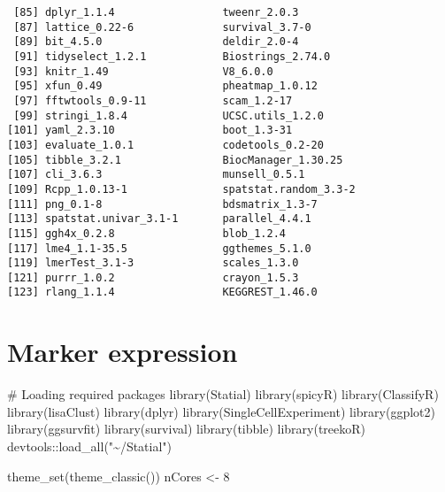 \documentclass[
  letterpaper,
  DIV=11,
  numbers=noendperiod]{scrreprt}
\newenvironment{Shaded}{\begin{snugshade}}{\end{snugshade}}
\newcommand{\CommentTok}[1]{\textcolor[rgb]{0.37,0.37,0.37}{#1}}
\newcommand{\DecValTok}[1]{\textcolor[rgb]{0.68,0.00,0.00}{#1}}
\newcommand{\FunctionTok}[1]{\textcolor[rgb]{0.28,0.35,0.67}{#1}}
\newcommand{\NormalTok}[1]{\textcolor[rgb]{0.00,0.23,0.31}{#1}}
\newcommand{\OtherTok}[1]{\textcolor[rgb]{0.00,0.23,0.31}{#1}}
\newcommand{\SpecialCharTok}[1]{\textcolor[rgb]{0.37,0.37,0.37}{#1}}
\newcommand{\StringTok}[1]{\textcolor[rgb]{0.13,0.47,0.30}{#1}}
\begin{document}
\begin{verbatim}
 [85] dplyr_1.1.4                 tweenr_2.0.3               
 [87] lattice_0.22-6              survival_3.7-0             
 [89] bit_4.5.0                   deldir_2.0-4               
 [91] tidyselect_1.2.1            Biostrings_2.74.0          
 [93] knitr_1.49                  V8_6.0.0                   
 [95] xfun_0.49                   pheatmap_1.0.12            
 [97] fftwtools_0.9-11            scam_1.2-17                
 [99] stringi_1.8.4               UCSC.utils_1.2.0           
[101] yaml_2.3.10                 boot_1.3-31                
[103] evaluate_1.0.1              codetools_0.2-20           
[105] tibble_3.2.1                BiocManager_1.30.25        
[107] cli_3.6.3                   munsell_0.5.1              
[109] Rcpp_1.0.13-1               spatstat.random_3.3-2      
[111] png_0.1-8                   bdsmatrix_1.3-7            
[113] spatstat.univar_3.1-1       parallel_4.4.1             
[115] ggh4x_0.2.8                 blob_1.2.4                 
[117] lme4_1.1-35.5               ggthemes_5.1.0             
[119] lmerTest_3.1-3              scales_1.3.0               
[121] purrr_1.0.2                 crayon_1.5.3               
[123] rlang_1.1.4                 KEGGREST_1.46.0            
\end{verbatim}


\chapter{Marker expression}\label{marker-expression}

\begin{Shaded}
\begin{Highlighting}[]
\CommentTok{\# Loading required packages}
\FunctionTok{library}\NormalTok{(Statial)}
\FunctionTok{library}\NormalTok{(spicyR)}
\FunctionTok{library}\NormalTok{(ClassifyR)}
\FunctionTok{library}\NormalTok{(lisaClust)}
\FunctionTok{library}\NormalTok{(dplyr)}
\FunctionTok{library}\NormalTok{(SingleCellExperiment)}
\FunctionTok{library}\NormalTok{(ggplot2)}
\FunctionTok{library}\NormalTok{(ggsurvfit)}
\FunctionTok{library}\NormalTok{(survival)}
\FunctionTok{library}\NormalTok{(tibble)}
\FunctionTok{library}\NormalTok{(treekoR)}
\NormalTok{devtools}\SpecialCharTok{::}\FunctionTok{load\_all}\NormalTok{(}\StringTok{"\textasciitilde{}/Statial"}\NormalTok{)}

\FunctionTok{theme\_set}\NormalTok{(}\FunctionTok{theme\_classic}\NormalTok{())}
\NormalTok{nCores }\OtherTok{\textless{}{-}} \DecValTok{8}
\end{Highlighting}
\end{Shaded}
\end{document}
